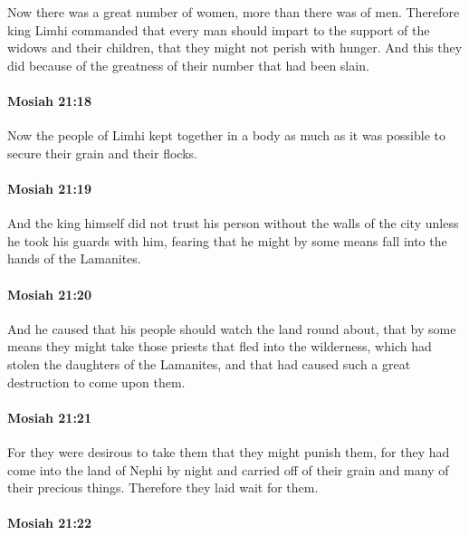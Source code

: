 			Now there was a great number of women, more than there was of men.
			Therefore king Limhi commanded
			that every man should impart to the support of the widows and their children,
			that they might not perish with hunger.
			And this they did because of the greatness of their number that had been slain.

		\paragraph{Mosiah 21:18} %
			\label{MOSIAH-21-18}

			Now the people of Limhi kept together in a body
			as much as it was possible
			to secure their grain and their flocks.

		\paragraph{Mosiah 21:19} %
			\label{MOSIAH-21-19}

			And the king himself did not trust his person without the walls of the city
			unless he took his guards with him,
			fearing that he might by some means fall into the hands of the Lamanites.

		\paragraph{Mosiah 21:20} %
			\label{MOSIAH-21-20}

			And he caused that his people should watch the land round about,
			that by some means they might take those priests that fled into the wilderness,
			which had stolen the daughters of the Lamanites,
			and that had caused such a great destruction to come upon them.

		\paragraph{Mosiah 21:21} %
			\label{MOSIAH-21-21}

			For they were desirous to take them that they might punish them,
			for they had come into the land of Nephi by night
			and carried off of their grain and many of their precious things.
			Therefore they laid wait for them.

		\paragraph{Mosiah 21:22} %
			\label{MOSIAH-21-22}

